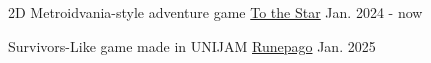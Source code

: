 

\begin{cventries}

  \cventry
    {2D Metroidvania-style adventure game} %
    {\href{https://github.com/GPOS-Gamemakers-in-POSTECH/GPOS-2024-to_the_STAR}{To the Star}} %
    {} %
    {Jan. 2024 - now} %
    {}

  \cventry
    {Survivors-Like game made in UNIJAM} %
    {\href{https://github.com/jjong22/Runepago}{Runepago}} %
    {} %
    {Jan. 2025} %
    {}

\end{cventries}
